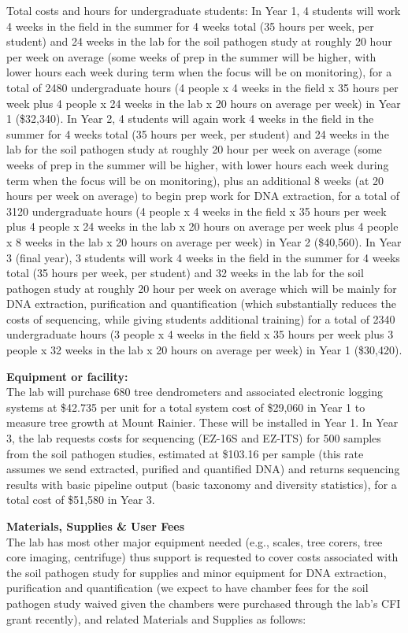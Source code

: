 \documentclass[12pt,oneside]{article}
\begin{document}
Total costs and hours for undergraduate students: In Year 1, 4 students will work 4 weeks in the field in the summer for 4 weeks total (35 hours per week, per student) and 24 weeks in the lab for the soil pathogen study at roughly 20 hour per week on average (some weeks of prep in the summer will be higher, with lower hours each week during term when the focus will be on monitoring), for a total of 2480 undergraduate hours (4 people x 4 weeks in the field x 35 hours per week plus 4 people x 24 weeks in the lab x 20 hours on average per week) in Year 1 (\$32,340). In Year 2, 4 students will again work 4 weeks in the field in the summer for 4 weeks total (35 hours per week, per student) and 24 weeks in the lab for the soil pathogen study at roughly 20 hour per week on average (some weeks of prep in the summer will be higher, with lower hours each week during term when the focus will be on monitoring), plus an additional 8 weeks (at 20 hours per week on average) to begin prep work for DNA extraction, for a total of 3120 undergraduate hours (4 people x 4 weeks in the field x 35 hours per week plus 4 people x 24 weeks in the lab x 20 hours on average per week plus 4 people x 8 weeks in the lab x 20 hours on average per week) in Year 2 (\$40,560). In Year 3 (final year), 3 students will work 4 weeks in the field in the summer for 4 weeks total (35 hours per week, per student) and 32 weeks in the lab for the soil pathogen study at roughly 20 hour per week on average which will be mainly for DNA extraction, purification and quantification (which substantially reduces the costs of sequencing, while giving students additional training) for a total of 2340 undergraduate hours (3 people x 4 weeks in the field x 35 hours per week plus 3 people x 32 weeks in the lab x 20 hours on average per week) in Year 1 (\$30,420). 

{\bf Equipment or facility:}\\
The lab will purchase 680 tree dendrometers and associated electronic logging systems at \$42.735 per unit for a total system cost of \$29,060 in Year 1 to measure tree growth at Mount Rainier. These will be installed in Year 1. In Year 3, the lab requests costs for sequencing (EZ-16S and EZ-ITS) for 500 samples from the soil pathogen studies, estimated at \$103.16 per sample (this rate assumes we send extracted, purified and quantified DNA) and returns sequencing results with basic pipeline output (basic taxonomy and diversity statistics), for a total cost of \$51,580 in Year 3.  

{\bf Materials, Supplies \& User Fees}\\
The lab has most other major equipment needed (e.g., scales, tree corers, tree core imaging, centrifuge) thus support is requested to cover costs associated with the soil pathogen study for supplies and minor equipment for DNA extraction, purification and quantification (we expect to have chamber fees for the soil pathogen study waived given the chambers were purchased through the lab's CFI grant recently), and related Materials and Supplies as follows:
\end{document}
